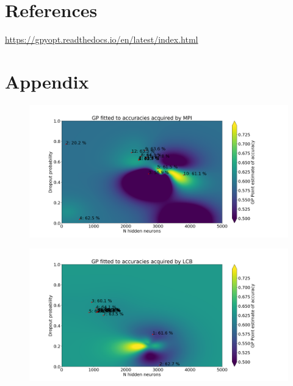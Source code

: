 \documentclass[12pt,fleqn]{article}
\begin{document}
\section{References}
\url{https://gpyopt.readthedocs.io/en/latest/index.html}
\section{Appendix}
\begin{figure}[H]

		\includegraphics[width=\textwidth]{MPIGP}	
\end{figure}
\begin{figure}[H]
		\includegraphics[width=\textwidth]{LCBGP}	

\end{figure}
\end{document}
